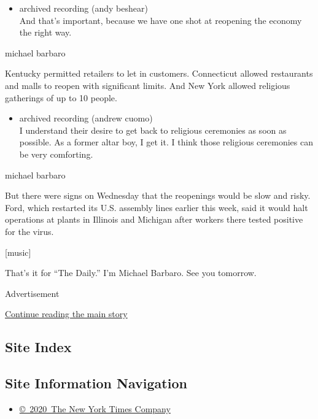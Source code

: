 \begin{itemize}
\tightlist
\item
  archived recording (andy beshear)\\
  And that's important, because we have one shot at reopening the
  economy the right way.
\end{itemize}

michael barbaro

Kentucky permitted retailers to let in customers. Connecticut allowed
restaurants and malls to reopen with significant limits. And New York
allowed religious gatherings of up to 10 people.

\begin{itemize}
\tightlist
\item
  archived recording (andrew cuomo)\\
  I understand their desire to get back to religious ceremonies as soon
  as possible. As a former altar boy, I get it. I think those religious
  ceremonies can be very comforting.
\end{itemize}

michael barbaro

But there were signs on Wednesday that the reopenings would be slow and
risky. Ford, which restarted its U.S. assembly lines earlier this week,
said it would halt operations at plants in Illinois and Michigan after
workers there tested positive for the virus.

{[}music{]}

That's it for ``The Daily.'' I'm Michael Barbaro. See you tomorrow.

Advertisement

\protect\hyperlink{after-bottom}{Continue reading the main story}

\hypertarget{site-index}{%
\subsection{Site Index}\label{site-index}}

\hypertarget{site-information-navigation}{%
\subsection{Site Information
Navigation}\label{site-information-navigation}}

\begin{itemize}
\tightlist
\item
  \href{https://help.nytimes3xbfgragh.onion/hc/en-us/articles/115014792127-Copyright-notice}{©~2020~The
  New York Times Company}
\end{itemize}

